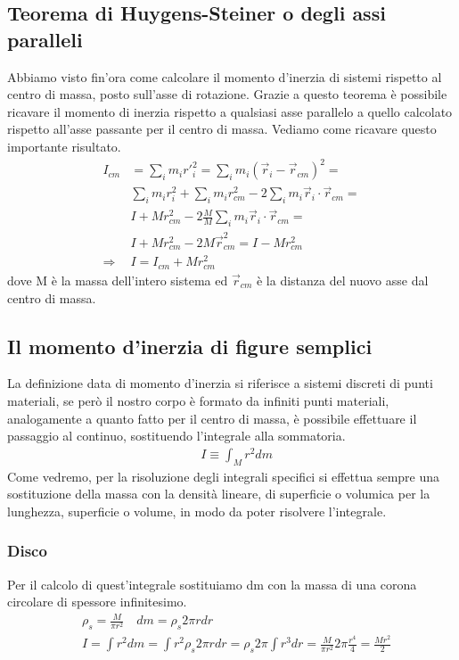 \documentclass[10pt,a4paper]{article}
\begin{document}
\subsection{Teorema di Huygens-Steiner o degli assi paralleli}
Abbiamo visto fin'ora come calcolare il momento d'inerzia di sistemi rispetto al centro di massa, posto sull'asse di rotazione. Grazie a questo teorema è possibile ricavare il momento di inerzia rispetto a qualsiasi asse parallelo a quello calcolato rispetto all'asse passante per il centro di massa. Vediamo come ricavare questo importante risultato. 
\begin{align*}
	I_{cm} &= \sum_i m_i r'^2_i = \sum_i m_i (\vec{r}_i-\vec{r}_{cm})^2 =\\
	& \sum_i m_i r_i^2 + \sum_i m_i r_{cm}^2 -2\sum_i m_i \vec{r}_i\cdot \vec{r}_{cm} =\\
	&I + M r_{cm}^2 -2 \frac{M}{M} \sum_i m_i \vec{r}_i\cdot \vec{r}_{cm} =\\
	&I + M r_{cm}^2 -2 M \vec{r}_{cm}^2 = I - M r_{cm}^2\\
	\Rightarrow & I = I_{cm} +  M r_{cm}^2
\end{align*}
dove M è la massa dell'intero sistema ed $\vec{r}_{cm}$ è la distanza del nuovo asse dal centro di massa. 
\subsection{Il momento d'inerzia di figure semplici}
La definizione data di momento d'inerzia si riferisce a sistemi discreti di punti materiali, se però il nostro corpo è formato da infiniti punti materiali, analogamente a quanto fatto per il centro di massa, è possibile effettuare il passaggio al continuo, sostituendo l'integrale alla sommatoria. 
\begin{align*}
	&I \equiv \int_M r^2 dm
\end{align*}
Come vedremo, per la risoluzione degli integrali specifici si effettua sempre una sostituzione della massa con la densità lineare, di superficie o volumica per la lunghezza, superficie o volume, in modo da poter risolvere l'integrale.
\subsubsection*{Disco}
Per il calcolo di quest'integrale sostituiamo dm con la massa di una corona circolare di spessore infinitesimo.
\begin{align*}
	&\rho_s = \frac{M}{\pi r^2} \quad dm = \rho_s 2 \pi r dr \\
	&I = \int r^2 dm = \int r^2 \rho_s 2\pi r dr = \rho_s 2\pi \int r^3 dr = \frac{M}{\pi r^2} 2\pi \frac{r^4}{4} = \frac{M r^2}{2}  
\end{align*}
\end{document}
